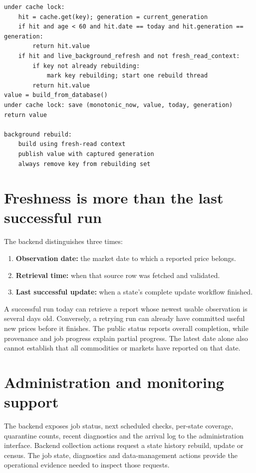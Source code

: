 \documentclass[12pt,a4paper,oneside]{report}
\numberwithin{equation}{chapter}
\numberwithin{figure}{chapter}
\numberwithin{table}{chapter}
\theoremstyle{definition}
\begin{document}
\begin{lstlisting}[caption={Algorithm: serve and refresh a cached backend list}]
under cache lock:
    hit = cache.get(key); generation = current_generation
    if hit and age < 60 and hit.date == today and hit.generation == generation:
        return hit.value
    if hit and live_background_refresh and not fresh_read_context:
        if key not already rebuilding:
            mark key rebuilding; start one rebuild thread
        return hit.value
value = build_from_database()
under cache lock: save (monotonic_now, value, today, generation)
return value

background rebuild:
    build using fresh-read context
    publish value with captured generation
    always remove key from rebuilding set
\end{lstlisting}

\section{Freshness is more than the last successful run}
The backend distinguishes three times:
\begin{enumerate}
  \item \textbf{Observation date:} the market date to which a reported price belongs.
  \item \textbf{Retrieval time:} when that source row was fetched and validated.
  \item \textbf{Last successful update:} when a state's complete update workflow finished.
\end{enumerate}
A successful run today can retrieve a report whose newest usable observation is several days old. Conversely, a retrying run can already have committed useful new prices before it finishes. The public status reports overall completion, while provenance and job progress explain partial progress. The latest date alone also cannot establish that all commodities or markets have reported on that date.

\section{Administration and monitoring support}
The backend exposes job status, next scheduled checks, per-state coverage, quarantine counts, recent diagnostics and the arrival log to the administration interface. Backend collection actions request a state history rebuild, update or census. The job state, diagnostics and data-management actions provide the operational evidence needed to inspect those requests.
\end{document}
